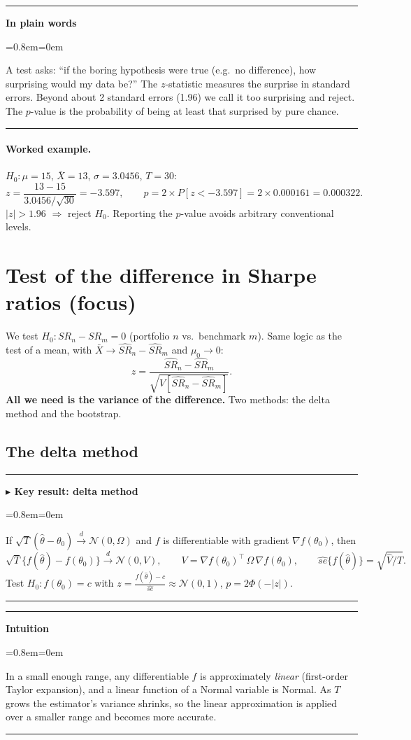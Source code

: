 \documentclass[11pt,a4paper]{report}
\newenvironment{notebox}[1]
  {\par\medskip\Needspace{6\baselineskip}\noindent\rule{\linewidth}{0.4pt}\par\nopagebreak
   \noindent\textbf{#1}\par\nopagebreak
   \begin{list}{}{\leftmargin=0.8em\rightmargin=0em\topsep=2pt}\item[]}
  {\end{list}\nopagebreak\noindent\rule{\linewidth}{0.4pt}\par\medskip}
\newenvironment{keybox}[1][]{\begin{notebox}{$\blacktriangleright$ Key result#1}}{\end{notebox}}
\newenvironment{intuition}{\begin{notebox}{Intuition}}{\end{notebox}}
\newenvironment{plainbox}{\begin{notebox}{In plain words}}{\end{notebox}}
\newcommand{\T}{^{\top}}
\begin{document}
\begin{plainbox}
A test asks: ``if the boring hypothesis were true (e.g.\ no difference), how
surprising would my data be?'' The $z$-statistic measures the surprise in
standard errors. Beyond about 2 standard errors (1.96) we call it too surprising
and reject. The $p$-value is the probability of being at least that surprised by
pure chance.
\end{plainbox}
\paragraph{Worked example.} $H_0:\mu=15$, $\bar X=13$, $\sigma=3.0456$, $T=30$:
\[
z=\frac{13-15}{3.0456/\sqrt{30}}=-3.597,\qquad
p=2\times P[z<-3.597]=2\times0.000161=0.000322 .
\]
$|z|>1.96$ $\Rightarrow$ reject $H_0$. Reporting the $p$-value avoids arbitrary
conventional levels.

\section{Test of the difference in Sharpe ratios (focus)}
We test $H_0: SR_n-SR_m=0$ (portfolio $n$ vs.\ benchmark $m$). Same logic as the
test of a mean, with $\bar X\to \widehat{SR}_n-\widehat{SR}_m$ and $\mu_0\to0$:
\[
z=\frac{\widehat{SR}_n-\widehat{SR}_m}{\sqrt{V[\widehat{SR}_n-\widehat{SR}_m]}} .
\]
\textbf{All we need is the variance of the difference.} Two methods: the delta
method and the bootstrap.

\subsection{The delta method}
\begin{keybox}[: delta method]
If $\sqrt T(\hat\theta-\theta_0)\xrightarrow{d}\mathcal N(0,\Omega)$ and $f$ is
differentiable with gradient $\nabla f(\theta_0)$, then
\[
\sqrt T\{f(\hat\theta)-f(\theta_0)\}\xrightarrow{d}\mathcal N(0,V),\qquad
V=\nabla f(\theta_0)\T\,\Omega\,\nabla f(\theta_0),
\qquad \widehat{se}\{f(\hat\theta)\}=\sqrt{\hat V/T}.
\]
Test $H_0:f(\theta_0)=c$ with $z=\frac{f(\hat\theta)-c}{\widehat{se}}\approx\mathcal N(0,1)$, $p=2\Phi(-|z|)$.
\end{keybox}
\begin{intuition}
In a small enough range, any differentiable $f$ is approximately \emph{linear}
(first-order Taylor expansion), and a linear function of a Normal variable is
Normal. As $T$ grows the estimator's variance shrinks, so the linear
approximation is applied over a smaller range and becomes more accurate.
\end{intuition}
\end{document}
